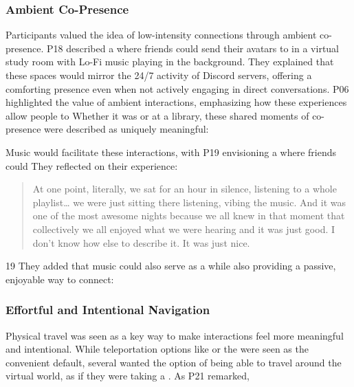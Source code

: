 \subsubsection{Ambient Co-Presence}
\label{lab:4-2-3}
Participants valued the idea of low-intensity connections through ambient co-presence. P18 described a  where friends could send their avatars to  in a virtual study room with Lo-Fi music playing in the background. They explained that these spaces would mirror the 24/7 activity of Discord servers, offering a comforting presence even when not actively engaging in direct conversations. P06 highlighted the value of ambient interactions, emphasizing how these experiences allow people to Whether it was  or  at a library, these shared moments of co-presence were described as uniquely meaningful: 

Music would facilitate these interactions, with P19 envisioning a  where friends could  They reflected on their experience: \blockquote{At one point, literally, we sat for an hour in silence, listening to a whole playlist\ldots{} we were just sitting there listening, vibing the music. And it was one of the most awesome nights because we all knew in that moment that collectively we all enjoyed what we were hearing and it was just good. I don't know how else to describe it. It was just nice.}{19} They added that music could also serve as a  while also providing a passive, enjoyable way to connect: 

\subsubsection{Effortful and Intentional Navigation}
\label{lab:4-2-4}
Physical travel was seen as a key way to make interactions feel more meaningful and intentional. While teleportation options like  or the  were seen as the convenient default, several wanted the option of being able to travel around the virtual world, as if they were taking a . As P21 remarked,  

